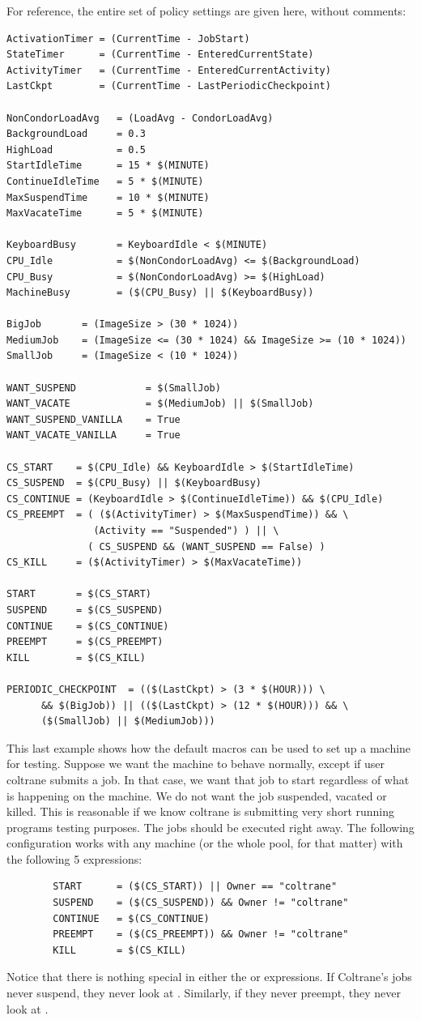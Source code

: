 For reference, the entire set of policy settings are
given here, without comments:
\begin{verbatim}
ActivationTimer = (CurrentTime - JobStart)
StateTimer      = (CurrentTime - EnteredCurrentState)
ActivityTimer   = (CurrentTime - EnteredCurrentActivity)
LastCkpt        = (CurrentTime - LastPeriodicCheckpoint)

NonCondorLoadAvg   = (LoadAvg - CondorLoadAvg)
BackgroundLoad     = 0.3
HighLoad           = 0.5
StartIdleTime      = 15 * $(MINUTE)
ContinueIdleTime   = 5 * $(MINUTE)
MaxSuspendTime     = 10 * $(MINUTE)
MaxVacateTime      = 5 * $(MINUTE)

KeyboardBusy       = KeyboardIdle < $(MINUTE)
CPU_Idle           = $(NonCondorLoadAvg) <= $(BackgroundLoad)
CPU_Busy           = $(NonCondorLoadAvg) >= $(HighLoad)
MachineBusy        = ($(CPU_Busy) || $(KeyboardBusy))

BigJob       = (ImageSize > (30 * 1024))
MediumJob    = (ImageSize <= (30 * 1024) && ImageSize >= (10 * 1024))
SmallJob     = (ImageSize < (10 * 1024))

WANT_SUSPEND            = $(SmallJob)
WANT_VACATE             = $(MediumJob) || $(SmallJob)
WANT_SUSPEND_VANILLA    = True
WANT_VACATE_VANILLA     = True

CS_START    = $(CPU_Idle) && KeyboardIdle > $(StartIdleTime)
CS_SUSPEND  = $(CPU_Busy) || $(KeyboardBusy)
CS_CONTINUE = (KeyboardIdle > $(ContinueIdleTime)) && $(CPU_Idle)
CS_PREEMPT  = ( ($(ActivityTimer) > $(MaxSuspendTime)) && \
               (Activity == "Suspended") ) || \
              ( CS_SUSPEND && (WANT_SUSPEND == False) )
CS_KILL     = ($(ActivityTimer) > $(MaxVacateTime))

START       = $(CS_START)
SUSPEND     = $(CS_SUSPEND)
CONTINUE    = $(CS_CONTINUE)
PREEMPT     = $(CS_PREEMPT)
KILL        = $(CS_KILL)

PERIODIC_CHECKPOINT  = (($(LastCkpt) > (3 * $(HOUR))) \
      && $(BigJob)) || (($(LastCkpt) > (12 * $(HOUR))) && \
      ($(SmallJob) || $(MediumJob)))
\end{verbatim}

This last example shows how the default macros can be used to
set up a machine for testing.
Suppose we want the machine to
behave normally, except if user coltrane submits a job.
In that case, we
want that job to start regardless of what is happening on the machine.
We do not want the job suspended, vacated or killed.
This is reasonable if 
we know coltrane is submitting very short
running programs testing purposes. 
The jobs should be executed right away.
The following configuration works with any machine
(or the whole pool, for that matter) with the following 5 expressions:
\begin{verbatim}
        START      = ($(CS_START)) || Owner == "coltrane"
        SUSPEND    = ($(CS_SUSPEND)) && Owner != "coltrane"
        CONTINUE   = $(CS_CONTINUE)
        PREEMPT    = ($(CS_PREEMPT)) && Owner != "coltrane"
        KILL       = $(CS_KILL)
\end{verbatim}
Notice that there is nothing special in either the
\Expr{CONTINUE} or \Expr{KILL} expressions.
If Coltrane's jobs never suspend, they never look at .  
Similarly, if they never preempt, they never look at . 

